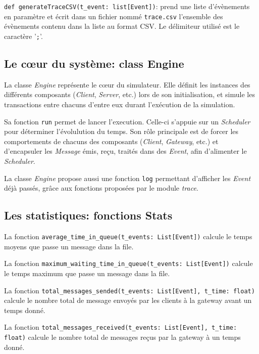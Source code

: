 \documentclass[11pt,a4paper]{article}
\begin{document}
\lstinline|def generateTraceCSV(t_event: list[Event])|: prend une liste d'évènements en paramètre et écrit dans un fichier nommé \lstinline|trace.csv| l'ensemble des évènements contenu dans la liste au format CSV. Le délimiteur utilisé est le caractère '\lstinline|;|'.

\bigskip

\subsection{Le cœur du système: class Engine}

La classe \emph{Engine} représente le cœur du simulateur. Elle définit les instances des différents composants (\emph{Client}, \emph{Server}, etc.) lors de son initialisation, et simule les transactions entre chacuns d'entre eux durant l'exécution de la simulation.

Sa fonction \lstinline|run| permet de lancer l'execution. Celle-ci s'appuie sur un \emph{Scheduler} pour déterminer l'évolulution du temps. Son rôle principale est de forcer les comportements de chacuns des composants (\emph{Client}, \emph{Gateway}, etc.) et d'encapsuler les \emph{Message} émis, reçu, traités dans des \emph{Event}, afin d'alimenter le \emph{Scheduler}.

La classe \emph{Engine} propose aussi une fonction \lstinline|log| permettant d'afficher les \emph{Event} déjà passés, grâce aux fonctions
proposées par le module \emph{trace}.

\bigskip

\subsection{Les statistiques: fonctions Stats}

La fonction \lstinline|average_time_in_queue(t_events: List[Event])| calcule le temps moyens que passe un message dans la file.

La fonction \lstinline|maximum_waiting_time_in_queue(t_events: List[Event])| calcule le temps maximum que passe un message dans la file.

La fonction \lstinline|total_messages_sended(t_events: List[Event], t_time: float)| calcule le nombre total de message envoyés par les clients à la gateway avant un temps donné.

La fonction \lstinline|total_messages_received(t_events: List[Event], t_time: float)| calcule le nombre total de messages reçus par la gateway à un temps donné.
\end{document}
